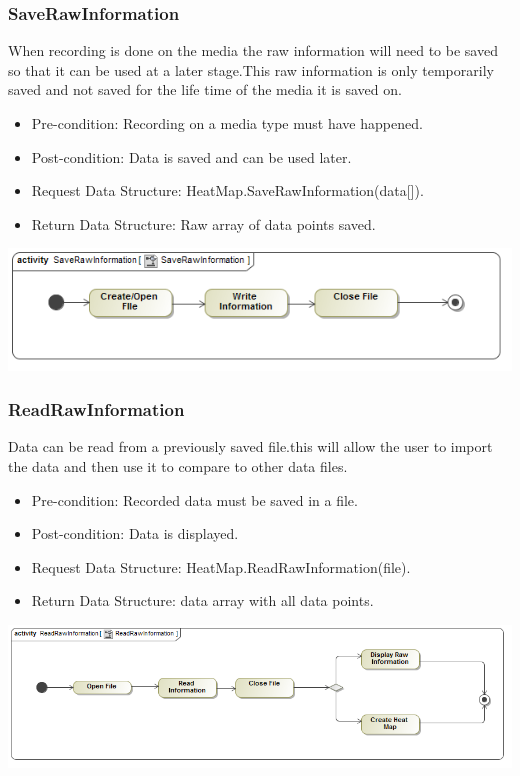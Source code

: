 	\subsubsection{SaveRawInformation}
When recording is done on the media the raw information will need to be saved so that it can be used at a later stage.This raw information is only temporarily saved and not saved for the life time of the media it is saved on.
\begin{itemize}
\item Pre-condition: Recording on a media type must have happened.
\item Post-condition: Data is saved and can be used later.
\item Request Data Structure: HeatMap.SaveRawInformation(data[]).
\item Return Data Structure: Raw array of data points saved.
\end{itemize}

	\includegraphics[scale=0.5]{Diagrams/Activity_Diagram__SaveRawInformation__SaveRawInformation.png}


	\subsubsection{ReadRawInformation}
Data can be read from a previously saved file.this will allow the user to import the data and then use it to compare to other data files.
\begin{itemize}
\item Pre-condition: Recorded data must be saved in a file.
\item Post-condition: Data is displayed.
\item Request Data Structure: HeatMap.ReadRawInformation(file).
\item Return Data Structure: data array with all data points.
\end{itemize}

	\includegraphics[scale=0.5]{Diagrams/Activity_Diagram__ReadRawInformation__ReadRawInformation.png}

